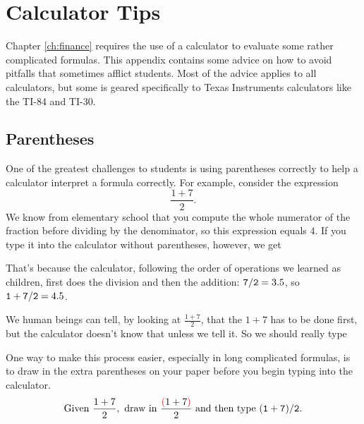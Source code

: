 \def\calckey#1{\fbox{\raisebox{0pt}[6pt][0pt]{\footnotesize\tt #1}}}

\def\calcscreen#1{%
\begin{center}%
  \fbox{%
    \begin{minipage}{2in}
      \tt
      #1
    \end{minipage}
  }
\end{center}%
}
\def\ca{\rule{0pt}{0pt}\hfill}

\def\caret{\char`\^}

\def\rightkey{\calckey{$\blacktriangleright$}}
\def\stokey{\calckey{STO$\blacktriangleright$}}

\def\tineg{\raisebox{1pt}[0pt][0pt]{-}}

\def\sto{\ensuremath{\rightarrow}}

\chapter{Calculator Tips} \label{ch:CalculatorTips}

Chapter \ref{ch:finance} requires the use of a calculator to evaluate some rather complicated formulas.
This appendix contains some advice on how to avoid pitfalls that sometimes afflict students.
Most of the advice applies to all calculators, but some is geared specifically to Texas Instruments calculators
like the TI-84 and TI-30.

\section{Parentheses}

One of the greatest challenges to students is using parentheses correctly to help a calculator interpret a formula correctly.
For example, consider the expression
\[\frac{1+7}{2}.\]
We know from elementary school that you compute the whole numerator of the fraction before dividing by the denominator,
so this expression equals $4$.
If you type it into the calculator without parentheses, however, we get
\calcscreen{1+7/2 \\
            \ca 4.5}
That's because the calculator, following the order of operations we learned as children,
first does the division and then the addition: ${\tt 7/2} = 3.5$, so ${\tt 1+7/2}=4.5$.

We human beings can tell, by looking at $\frac{1+7}{2}$, that the $1+7$ has to be done first,
but the calculator doesn't know that unless we tell it.  So we should really type
\calcscreen{(1+7)/2 \\
            \ca 4}
One way to make this process easier, especially in long complicated formulas, is to draw in the extra parentheses on your paper before you begin typing into the calculator.
\[\mbox{Given~}\frac{1+7}{2},\mbox{~draw in~}\frac{\textcolor{red}{(}1+7\textcolor{red}{)}}{2}\mbox{~and then type~}{\tt (1+7)/2}.\]

